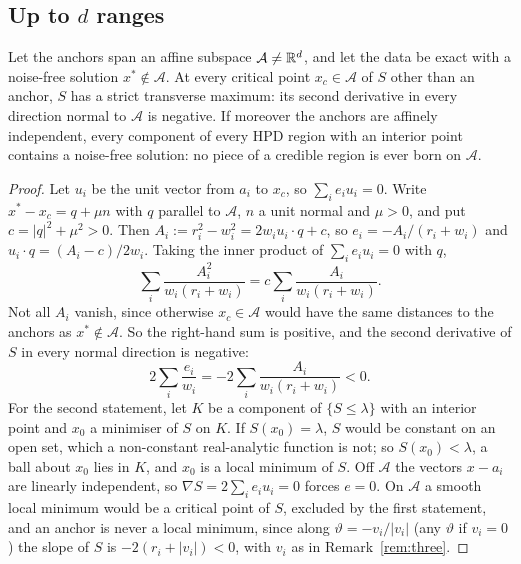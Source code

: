 \subsection{Up to $d$ ranges}\label{sec:nranges}

\begin{lemma}\label{lem:subspace}
Let the anchors span an affine subspace $\mathcal A \ne \mathbb{R}^d$, and let the data be exact with a noise-free solution $x^* \notin \mathcal A$.
At every critical point $x_c \in \mathcal A$ of $S$ other than an anchor, $S$ has a strict transverse maximum: its second derivative
in every direction normal to $\mathcal A$ is negative. If moreover the anchors are affinely independent, every component of every
HPD region with an interior point contains a noise-free solution: no piece of a credible region is ever born on $\mathcal A$.
\end{lemma}

\begin{proof}
Let $u_i$ be the unit vector from $a_i$ to $x_c$, so $\sum_i e_iu_i = 0$. Write $x^* - x_c = q + \mu n$ with $q$ parallel to
$\mathcal A$, $n$ a unit normal and $\mu > 0$, and put $c = |q|^2 + \mu^2 > 0$. Then $A_i := r_i^2 - w_i^2 = 2w_iu_i\cdot q + c$,
so $e_i = -A_i/(r_i + w_i)$ and $u_i\cdot q = (A_i - c)/2w_i$. Taking the inner product of $\sum_i e_iu_i = 0$ with $q$,
\[ \sum_i \frac{A_i^2}{w_i(r_i + w_i)} = c\sum_i \frac{A_i}{w_i(r_i + w_i)} . \]
Not all $A_i$ vanish, since otherwise $x_c \in \mathcal A$ would have the same distances to the anchors as $x^* \notin \mathcal A$. So the
right-hand sum is positive, and the second derivative of $S$ in every normal direction is negative:
\[ 2\sum_i \frac{e_i}{w_i} = -2\sum_i \frac{A_i}{w_i(r_i + w_i)} < 0 . \]
For the second statement, let $K$ be a component of $\{S \le \lambda\}$ with an interior point and $x_0$ a minimiser of
$S$ on $K$. If $S(x_0) = \lambda$, $S$ would be constant on an open set, which a non-constant real-analytic function is not; so
$S(x_0) < \lambda$, a ball about $x_0$ lies in $K$, and $x_0$ is a local minimum of $S$.
Off $\mathcal A$ the vectors $x - a_i$ are linearly independent, so $\nabla S = 2\sum_i e_iu_i = 0$ forces $e = 0$. On $\mathcal A$ a smooth
local minimum would be a critical point of $S$, excluded by the first statement, and an anchor is never a local minimum,
since along $\vartheta = -v_i/|v_i|$ (any $\vartheta$ if $v_i = 0$) the slope of $S$ is $-2(r_i + |v_i|) < 0$, with $v_i$ as in
Remark~\ref{rem:three}.
\end{proof}

